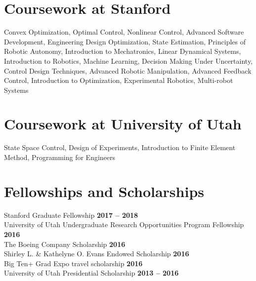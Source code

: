 \documentclass[margin,line]{res}
\begin{document}
\begin{resume}
\section{\sc Coursework at Stanford}
Convex Optimization, Optimal Control, Nonlinear Control, Advanced Software Development, Engineering Design Optimization, State Estimation, Principles of Robotic Autonomy, Introduction to Mechatronics, Linear Dynamical Systems, Introduction to Robotics, Machine Learning, Decision Making Under Uncertainty, Control Design Techniques, Advanced Robotic Manipulation, Advanced Feedback Control, Introduction to Optimization, Experimental Robotics, Multi-robot Systems
\\
\section{\sc Coursework at University of Utah}
State Space Control, Design of Experiments, Introduction to Finite Element Method, Programming for Engineers
\\

\section{\sc Fellowships and Scholarships}
Stanford Graduate Fellowship \hfill {\bf 2017 – 2018}\\
University of Utah Undergraduate Research Opportunities Program Fellowship \hfill {\bf 2016}\\
The Boeing Company Scholarship \hfill {\bf 2016}\\
Shirley L. \& Kathelyne O. Evans Endowed Scholarship \hfill {\bf 2016}\\
Big Ten+ Grad Expo travel scholarship \hfill {\bf 2016}\\
University of Utah Presidential Scholarship \hfill {\bf 2013 – 2016}
\\


\end{resume}
\end{document}
